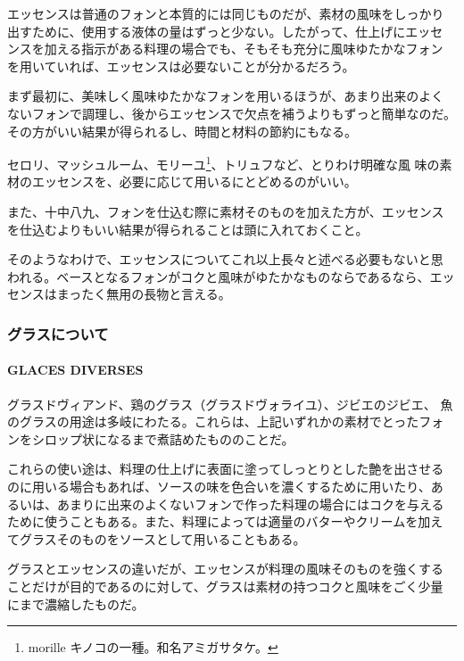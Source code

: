 \documentclass[twoside,12Q,b5j]{escoffierltjsbook}
\newenvironment{recette}{\begin{multicols}{2}}{\end{multicols}}
\begin{document}
\begin{recette}
エッセンスは普通のフォンと本質的には同じものだが、素材の風味をしっかり
出すために、使用する液体の量はずっと少ない。したがって、仕上げにエッセ
ンスを加える指示がある料理の場合でも、そもそも充分に風味ゆたかなフォン
を用いていれば、エッセンスは必要ないことが分かるだろう。

まず最初に、美味しく風味ゆたかなフォンを用いるほうが、あまり出来のよく
ないフォンで調理し、後からエッセンスで欠点を補うよりもずっと簡単なのだ。
その方がいい結果が得られるし、時間と材料の節約にもなる。

セロリ、マッシュルーム、モリーユ\footnote{morille
  キノコの一種。和名アミガサタケ。}、トリュフなど、とりわけ明確な風
味の素材のエッセンスを、必要に応じて用いるにとどめるのがいい。

また、十中八九、フォンを仕込む際に素材そのものを加えた方が、エッセンス
を仕込むよりもいい結果が得られることは頭に入れておくこと。

そのようなわけで、エッセンスについてこれ以上長々と述べる必要もないと思
われる。ベースとなるフォンがコクと風味がゆたかなものならであるなら、エッ
センスはまったく無用の長物と言える。

\vspace*{2\zw}

\subsubsection{グラスについて}\label{ux30b0ux30e9ux30b9ux306bux3064ux3044ux3066}

\paragraph{GLACES DIVERSES}\label{glaces-diverses}


グラスドヴィアンド、鶏のグラス（グラスドヴォライユ）、ジビエのジビエ、
魚のグラスの用途は多岐にわたる。これらは、上記いずれかの素材でとったフォ
ンをシロップ状になるまで煮詰めたもののことだ。

これらの使い途は、料理の仕上げに表面に塗ってしっとりとした艶を出させる
のに用いる場合もあれば、ソースの味を色合いを濃くするために用いたり、あ
るいは、あまりに出来のよくないフォンで作った料理の場合にはコクを与える
ために使うこともある。また、料理によっては適量のバターやクリームを加え
てグラスそのものをソースとして用いることもある。

グラスとエッセンスの違いだが、エッセンスが料理の風味そのものを強くする
ことだけが目的であるのに対して、グラスは素材の持つコクと風味をごく少量
にまで濃縮したものだ。


\end{recette}
\end{document}
